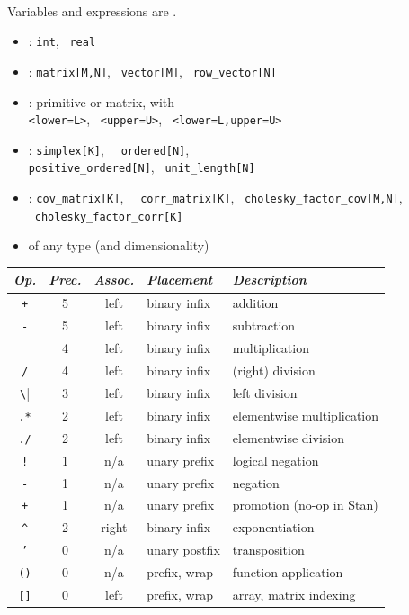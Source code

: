 \documentclass[10pt]{report}
\newcommand{\sld}[1]{\newpage{\noindent\LARGE \ \ \
    \textcolor{MidnightBlue}{\bfseries #1}}\vspace*{4pt}}
\newcommand{\code}[1]{{\tt #1}}
\newcommand{\spc}{\hspace*{0.25in}}
\newcommand{\myemph}[1]{{\color{MidnightBlue}{\bfseries #1}}}
\begin{document}
\sld{Variable and Expression Types}
\\[3pt]
\hspace*{17pt}Variables and expressions are \myemph{strongly, statically typed}.
\begin{itemize}
\item \myemph{Primitive}: {\tt\small int}, \ {\tt\small real}
\item \myemph{Matrix}: {\tt\small matrix[M,N]}, \ {\tt\small vector[M]}, \ {\tt\small row\_vector[N]}
\item \myemph{Bounded}: primitive or matrix, with 
\\ {\tt\small <lower=L>}, \ {\tt\small <upper=U>}, \ {\tt\small <lower=L,upper=U>}
\item \myemph{Constrained Vectors}: {\tt\small simplex[K]}, \ {\tt\small
    ordered[N]},
\\ {\tt\small positive\_ordered[N]}, \ {\tt\small unit\_length[N]}
\item \myemph{Constrained Matrices}: {\tt\small cov\_matrix[K]}, \ {\tt\small
    corr\_matrix[K]}, \ {\tt\small cholesky\_factor\_cov[M,N]}, \
  {\tt\small cholesky\_factor\_corr[K]}
\item \myemph{Arrays:}  of any type (and dimensionality)
\end{itemize}


\sld{Arithmetic and Matrix Operators}
\vfill
\noindent\spc
{\footnotesize
\begin{tabular}{c|ccl|l}
{\it Op.} & {\it Prec.} & {\it Assoc.} & {\it
  Placement} & {\it Description}
\\ \hline \hline

\code{+} & 5 & left & binary infix & addition
\\
\code{-} & 5 & left & binary infix & subtraction
\\ \hline
\code{*} & 4 & left & binary infix & multiplication
\\
\code{/} & 4 & left & binary infix & (right) division
\\ \hline
\Verb|\| & 3 & left & binary infix & left division
\\ \hline
\code{.*} & 2 & left & binary infix & elementwise multiplication
\\
\code{./} & 2 & left & binary infix & elementwise division
\\ \hline
\code{!} & 1 & n/a & unary prefix & logical negation
\\
\code{-} & 1 & n/a & unary prefix & negation
\\ 
\code{+} & 1 & n/a & unary prefix & promotion (no-op in Stan)
\\ \hline
\Verb|^| & 2 & right & binary infix & exponentiation
\\ \hline
\code{'} & 0 & n/a & unary postfix & transposition
\\ \hline \hline
\code{()} & 0 & n/a & prefix, wrap & function application
\\
\code{[]} & 0 & left & prefix, wrap & array, matrix indexing
\end{tabular}
}
\vfill
\end{document}
